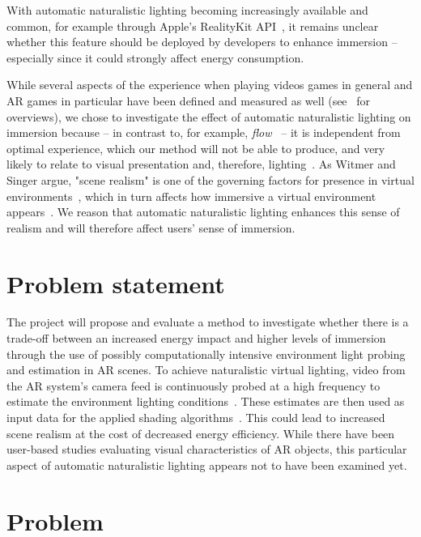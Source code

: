 \documentclass[12pt,twoside,english]{article}
\begin{document}
With automatic naturalistic lighting becoming increasingly available and common, for example through Apple's RealityKit API~\cite{apple_realitykit_nodate}, it remains unclear whether this feature should be deployed by developers to enhance immersion -- especially since it could strongly affect energy consumption.

While several aspects of the experience when playing videos games in general and \gls{AR} games in particular have been defined and measured as well (see~\cite{dey_systematic_2018, dunser_survey_2008} for overviews), we chose to investigate the effect of automatic naturalistic lighting on immersion because -- in contrast to, for example, \textit{flow}~\cite{csikszentmihalyi_flow_1990} -- it is independent from optimal experience, which our method will not be able to produce, and very likely to relate to visual presentation and, therefore, lighting~\cite{jennett_measuring_2008}.
As Witmer and Singer argue, "scene realism" is one of the governing factors for presence in virtual environments~\cite{witmer_measuring_1998}, which in turn affects how immersive a virtual environment appears~\cite{jennett_measuring_2008}.
We reason that automatic naturalistic lighting enhances this sense of realism and will therefore affect users' sense of immersion.

\section{Problem statement}
\label{sect:problem_statement}

The project will propose and evaluate a method to investigate whether there is a trade-off between an increased energy impact and higher levels of immersion through the use of possibly computationally intensive environment light probing and estimation in \gls{AR} scenes.
To achieve naturalistic virtual lighting, video from the \gls{AR} system's camera feed is continuously probed at a high frequency to estimate the environment lighting conditions~\cite{apple_adding_nodate}.
These estimates are then used as input data for the applied shading algorithms~\cite{apple_adding_nodate}.
This could lead to increased scene realism at the cost of decreased energy efficiency.
While there have been user-based studies evaluating visual characteristics of \gls{AR} objects, this particular aspect of automatic naturalistic lighting appears not to have been examined yet.

\section{Problem}
\label{sect:problem}
\end{document}
